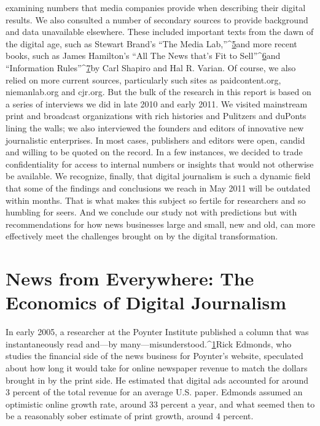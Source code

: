 examining numbers that media companies provide when describing their digital
results. We also consulted a number of secondary sources to provide background
and data unavailable elsewhere. These included important texts from the dawn
of the digital age, such as Stewart Brand's ``The Media Lab,''^{\href{#endnotes-introduction}{5}}and more recent
books, such as James Hamilton's ``All The News that's Fit to Sell''^{\href{#endnotes-introduction}{6}}and ``Information
Rules''^{\href{#endnotes-introduction}{7}}by Carl Shapiro and Hal R. Varian. Of course, we also relied on
more current sources, particularly such sites as paidcontent.org, niemanlab.org
and cjr.org.
But the bulk of the research in this report is based on a series of interviews we
did in late 2010 and early 2011. We visited mainstream print and broadcast organizations
with rich histories and Pulitzers and duPonts lining the walls; we also
interviewed the founders and editors of innovative new journalistic enterprises.
In most cases, publishers and editors were open, candid and willing to be quoted
on the record. In a few instances, we decided to trade confidentiality for access to
internal numbers or insights that would not otherwise be available.
We recognize, finally, that digital journalism is such a dynamic field that some
of the findings and conclusions we reach in May 2011 will be outdated within
months. That is what makes this subject so fertile for researchers and so humbling
for seers. And we conclude our study not with predictions but with recommendations
for how news businesses large and small, new and old, can more effectively
meet the challenges brought on by the digital transformation.

\chapter{News from Everywhere: The Economics of Digital Journalism}
In early 2005, a researcher at the Poynter Institute published a column that was
instantaneously read and—by many—misunderstood.^{\href{#endnotes-chapter-1}{1}}Rick Edmonds, who studies the financial side of the news business for Poynter's
website, speculated about how long it would take for online newspaper revenue
to match the dollars brought in by the print side. He estimated that digital
ads accounted for around 3 percent of the total revenue for an average U.S. paper.
Edmonds assumed an optimistic online growth rate, around 33 percent a year,
and what seemed then to be a reasonably sober estimate of print growth, around
4 percent.

